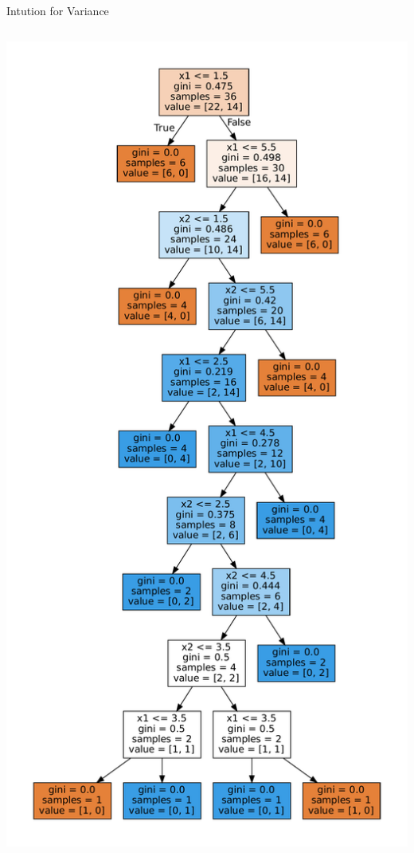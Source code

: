\documentclass[usenames,dvipsnames]{beamer}
\begin{document}
\begin{frame}{Intution for Variance}
\begin{columns}
\begin{column}{0.5\textwidth}
\begin{center}
\includegraphics[scale=0.2]{../assets/bias-variance/figures/bias-variance-full-depth-sklearn.pdf}

\end{center}
\end{column}
\end{columns}
\end{frame}
\end{document}
